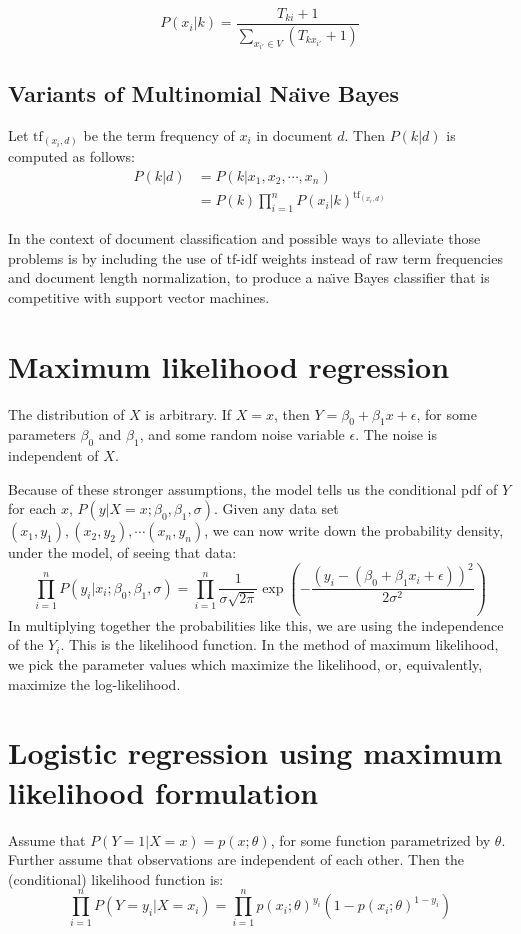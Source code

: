 \documentclass{article}
\begin{document}
\[P(x_i|k) = \frac{T_{ki}+1}{\sum_{x_{i'} \in V} (T_{kx_{i'}}+1)}\]



\subsection{Variants of Multinomial Na\"{\i}ve Bayes}
Let $\mbox{tf}_{(x_i,d)}$ be the term frequency of $x_i$ in document $d$. Then $P(k|d)$ is computed as follows:
\begin{align*} 
P(k|d) &= P(k|x_1,x_2,\cdots,x_n) \\
 &= P(k)\prod_{i=1}^{n} P(x_i|k)^{\mbox{tf}_{(x_i,d)}}
\end{align*}


In the context of document classification and possible ways to alleviate those problems is by including the use of $\mbox{tf-idf}$ weights instead of raw term frequencies and document length normalization, to produce a na\"{\i}ve Bayes classifier that is competitive with support vector machines.

\section{Maximum likelihood regression}
The distribution of $X$ is arbitrary. If $X=x$, then $Y=\beta_0+\beta_1 x+\epsilon$, for some parameters $\beta_0$ and $\beta_1$, and some random noise variable $\epsilon$. The noise is independent of $X$.

Because of these stronger assumptions, the model tells us the conditional pdf of $Y$ for each $x$, $P(y|X=x;\beta_0,\beta_1,\sigma)$. Given any data set $(x_1,y_1),(x_2,y_2),\cdots (x_n,y_n)$, we can now write down the probability density, under the model, of seeing that data:
\[
\prod_{i=1}^n P(y_i|x_i;\beta_0,\beta_1,\sigma) = \prod_{i=1}^n \frac{1}{\sigma\sqrt{2\pi}}  \exp \left( -\frac{(y_i-(\beta_0+\beta_1 x_i+\epsilon))^2}{2\sigma^2} \right)
\]
In multiplying together the probabilities like this, we are using the independence of the $Y_i$. This is the likelihood function. In the method of maximum likelihood, we pick the parameter values which  maximize  the  likelihood,  or,  equivalently,  maximize  the  log-likelihood.

\section{Logistic regression using maximum likelihood formulation}
Assume that $P(Y=1|X=x)=p(x;\theta)$, for some function parametrized by $\theta$. Further assume that observations are independent of each other. Then the (conditional) likelihood function is:
\[
\prod_{i=1}^{n} P(Y=y_i|X=x_i) = \prod_{i=1}^{n} p(x_i;\theta)^{y_i} (1-p(x_i;\theta)^{1-y_i}) 
\]
\end{document}
